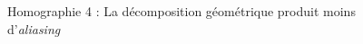 \begin{figure}
\caption{Homographie 4 : La décomposition géométrique produit moins d'\emph{aliasing}}
\label{Homo4}
\end{figure}
